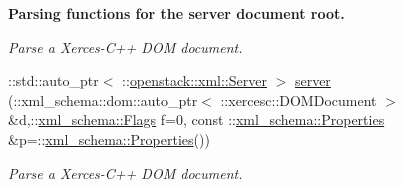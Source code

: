 \begin{Indent}{\bf Parsing functions for the server document root.}
\begin{DoxyCompactItemize}
\begin{DoxyCompactList}\small\item\em Parse a Xerces-\/C++ DOM document. \item\end{DoxyCompactList}\item 
::std::auto\_\-ptr$<$ ::\hyperlink{classopenstack_1_1xml_1_1Server}{openstack::xml::Server} $>$ \hyperlink{namespaceopenstack_1_1xml_aa3ba9d8ac66f4079036ba0971afecbca}{server} (::xml\_\-schema::dom::auto\_\-ptr$<$ ::xercesc::DOMDocument $>$ \&d,::\hyperlink{namespacexml__schema_affb4c227cbd9aa7453dd1dc5a1401943}{xml\_\-schema::Flags} f=0, const ::\hyperlink{namespacexml__schema_ad27ce19a7ee1d3b1064092648898f64c}{xml\_\-schema::Properties} \&p=::\hyperlink{namespacexml__schema_ad27ce19a7ee1d3b1064092648898f64c}{xml\_\-schema::Properties}())
\begin{DoxyCompactList}\small\item\em Parse a Xerces-\/C++ DOM document. \item\end{DoxyCompactList}\end{DoxyCompactItemize}
\end{Indent}
